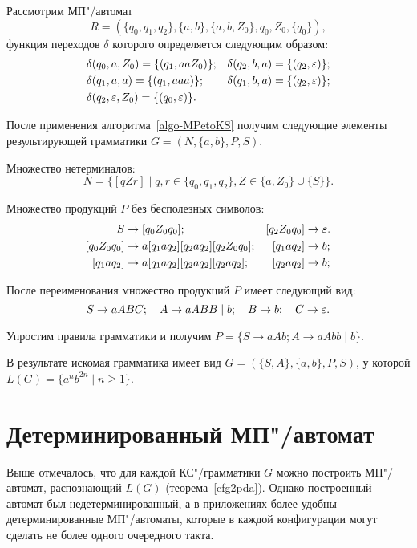 \begin{myexample}
Рассмотрим МП"/автомат
\[
    R = (\{ q_0, q_1, q_2 \}, \{a, b\}, \{a, b, Z_0\}, q_0, Z_0, \{ q_0 \}), 
\]
функция переходов $\delta$ которого определяется следующим образом:
\begin{align*}
    &\delta(q_0, a, Z_0) 	= \{ (q_1, aaZ_0) \}; & 
    &\delta(q_2, b, a) 		= \{ (q_2, \varepsilon) \};  \\
    &\delta(q_1, a, a) 	  = \{ (q_1, aaa) \}; &
    &\delta(q_1, b, a) 		= \{ (q_2, \varepsilon) \}; \\
    &\delta(q_2, \varepsilon, Z_0) 		= \{ (q_0, \varepsilon) \}. \\
\end{align*}

После применения алгоритма~\ref{algo-MPetoKS} получим следующие элементы результирующей грамматики $G = (N, \{a, b\}, P, S)$.

Множество нетерминалов:
\[N = \{ [qZr] \mid q, r \in \{ q_0, q_1, q_2 \}, Z \in \{a, Z_0\} \cup \{S\} \}.\]

Множество продукций $P$ без бесполезных символов:
\begin{align*}
    S	&\to [q_0Z_0q_0]; & [q_2Z_0q_0]     &\to  \varepsilon. \\
    [q_0Z_0q_0] 	  &\to a[q_1aq_2][q_2aq_2][q_2Z_0q_0]; & [q_1aq_2] &\to b;\\
    [q_1aq_2] 		&\to a[q_1aq_2][q_2aq_2][q_2aq_2];     & [q_2aq_2] &\to b; \\
\end{align*}

После переименования множество продукций $P$ имеет следующий вид:
\[
    S	\to aABC; \quad
    A 	\to aABB \mid b; \quad
    B 	\to b; \quad
    C 	\to  \varepsilon.
\]

Упростим правила грамматики и получим $P = \{ S \to aAb; A \to aAbb \mid b \}$.

В результате искомая грамматика имеет вид $G = (\{S, A\}, \{a, b\}, P, S)$, у которой $L(G) = \{ a^nb^{2n} \mid n \ge 1 \}$.
\end{myexample}

\section{Детерминированный МП"/автомат}
Выше отмечалось, что для каждой КС"/грамматики $G$ можно построить МП"/автомат, распознающий $L(G)$ (теорема~\ref{cfg2pda}). Однако построенный автомат был недетерминированный, а в приложениях более удобны детерминированные МП"/автоматы, которые в каждой конфигурации могут сделать не более одного очередного такта.

